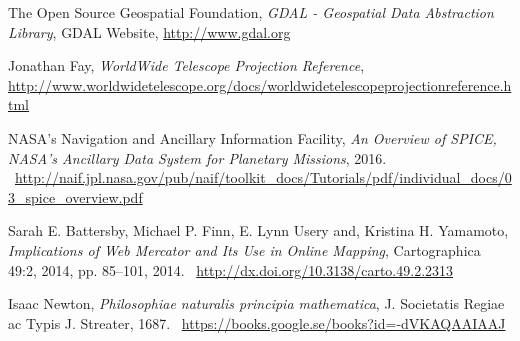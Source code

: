 \begin{thebibliography}{99}
  The Open Source Geospatial Foundation,
  \emph{GDAL - Geospatial Data Abstraction Library},
  GDAL Website,
  \url{http://www.gdal.org}

  Jonathan Fay,
  \emph{WorldWide Telescope Projection Reference},
  \url{http://www.worldwidetelescope.org/docs/worldwidetelescopeprojectionreference.html}

  NASA's Navigation and Ancillary Information Facility,
  \emph{An Overview of SPICE, NASA’s Ancillary Data System for Planetary Missions},
  2016. \
  \url{http://naif.jpl.nasa.gov/pub/naif/toolkit_docs/Tutorials/pdf/individual_docs/03_spice_overview.pdf}

  Sarah E. Battersby, Michael P. Finn, E. Lynn Usery and, Kristina H. Yamamoto,
  \emph{Implications of Web Mercator and Its Use in Online Mapping},
  Cartographica 49:2, 2014, pp. 85–101,
  2014. \
  \url{http://dx.doi.org/10.3138/carto.49.2.2313}

  Isaac Newton,
  \emph{Philosophiae naturalis principia mathematica},
  J. Societatis Regiae ac Typis J. Streater,
  1687. \
  \url{https://books.google.se/books?id=-dVKAQAAIAAJ}

\end{thebibliography}
